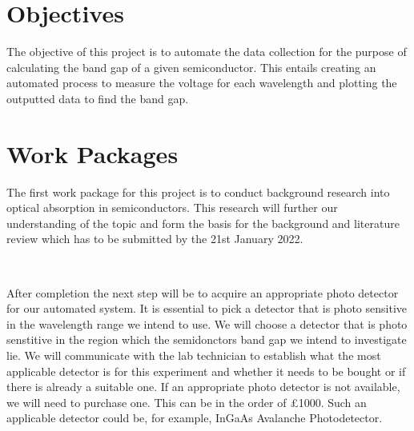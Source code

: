 \documentclass{article}
\begin{document}
\section*{Objectives}

The objective of this project is to automate the data collection for the purpose of calculating the band gap of a given semiconductor. This entails creating an automated process to measure the voltage for each wavelength and plotting the outputted data to find the band gap. 


\section*{Work Packages}

The first work package for this project is to conduct background research into optical absorption in semiconductors. This research will further our understanding of the topic and form the basis for the background and literature review which has to be submitted by the 21st January 2022. 

\

After completion the next step will be to acquire an appropriate photo detector for our automated system. It is essential to pick a detector that is photo sensitive in the wavelength range we intend to use. We will choose a detector that is photo senstitive in the region which the semidonctors band gap we intend to investigate lie. We will communicate with the lab technician to establish what the most applicable detector is for this experiment and whether it needs to be bought or if there is already a suitable one. If an appropriate photo detector is not available, we will need to purchase one. This can be in the order of \pounds 1000. Such an applicable detector could be, for example, InGaAs Avalanche Photodetector.



\


\end{document}

